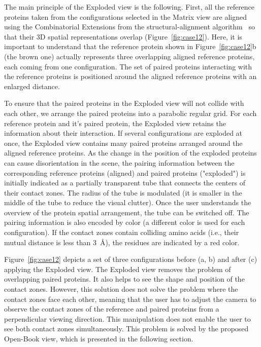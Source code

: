 \documentclass[twocolumn]{bmcart}%
\def\OpBook {Open-Book view\xspace}
\def\ExpView {Exploded view\xspace}
\def\MatView {Matrix view\xspace}
\begin{document}
The main principle of the \ExpView is the following.
First, all the reference proteins taken from the configurations selected in the \MatView are aligned using the Combinatorial Extensions from the structural-alignment algorithm~\cite{Shindyalov1998} so that their 3D spatial representations overlap (Figure~\ref{fig:case12}). 
Here, it is important to understand that the reference protein shown in Figure~\ref{fig:case12}b (the brown one) actually represents three overlapping aligned reference proteins, each coming from one configuration.
The set of paired proteins interacting with the reference proteins is positioned around the aligned reference proteins with an enlarged distance.

To ensure that the paired proteins in the Exploded view will not collide with each other, we arrange the paired proteins into a parabolic regular grid.
For each reference protein and it's paired protein, the \ExpView retains the information about their interaction.
If several configurations are exploded at once, the \ExpView contains many paired proteins arranged around the aligned reference proteins.
As the change in the position of the exploded proteins can cause disorientation in the scene, the pairing information between the corresponding reference proteins (aligned) and paired proteins ("exploded") is initially indicated as a partially transparent tube that connects the centers of their contact zones.
The radius of the tube is modulated (it is smaller in the middle of the tube to reduce the visual clutter).
Once the user understands the overview of the protein spatial arrangement, the tube can be switched off.
The pairing information is also encoded by color (a different color is used for each configuration).
If the contact zones contain colliding amino acids (i.e., their mutual distance is less than 3~\AA), the residues are indicated by a red color.

Figure~\ref{fig:case12} depicts a set of three configurations before (a, b) and after (c) applying the \ExpView.
The Exploded view removes the problem of overlapping paired proteins.
It also helps to see the shape and position of the contact zones.
However, this solution does not solve the problem where the contact zones face each other, meaning that the user has to adjust the camera to observe the contact zones of the reference and paired proteins from a perpendicular viewing direction. 
This manipulation does not enable the user to see both contact zones simultaneously.
This problem is solved by the proposed \OpBook, which is presented in the following section.
\end{document}
